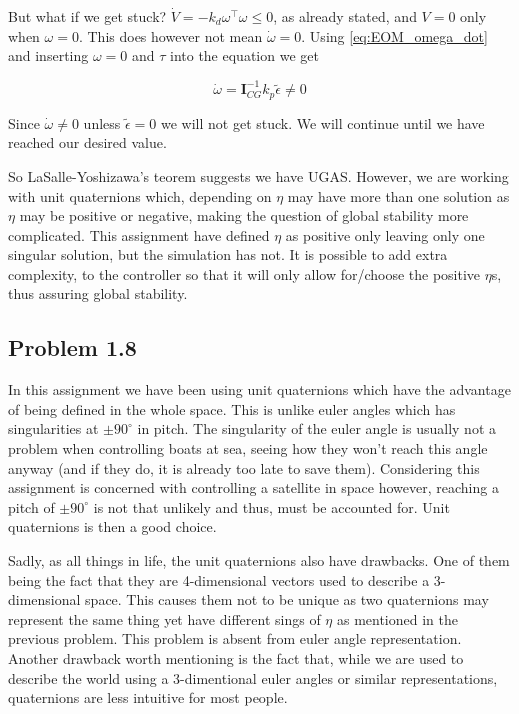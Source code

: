 But what if we get stuck? $\dot{V} = -k_d\omega^\top\omega \leq 0$, as already stated, and $V = 0$ only when $\omega = 0$. This does however not mean $\dot{\omega} = 0$. Using \eqref{eq:EOM_omega_dot} and inserting $\omega = 0$ and $\tau$ into the equation we get

\begin{equation}
    \dot{\omega} = \mathbf{I}_{CG}^{-1}k_p\tilde{\epsilon} \neq 0
\end{equation}

Since $\dot{\omega} \neq 0$ unless $\tilde{\epsilon} = 0$ we will not get stuck. We will continue until we have reached our desired value.

So LaSalle-Yoshizawa's teorem suggests we have UGAS. However, we are working with unit quaternions which, depending on $\eta$ may have more than one solution as $\eta$ may be positive or negative, making the question of global stability more complicated. This assignment have defined $\eta$ as positive only leaving only one singular solution, but the simulation has not. It is possible to add extra complexity, to the controller so that it will only allow for/choose the positive $\eta$s, thus assuring global stability. 


\subsection*{Problem 1.8}

In this assignment we have been using unit quaternions which have the advantage of being defined in the whole space. This is unlike euler angles which has singularities at $\pm 90^\circ$ in pitch. The singularity of the euler angle is usually not a problem when controlling boats at sea, seeing how they won't reach this angle anyway (and if they do, it is already too late to save them). Considering this assignment is concerned with controlling a satellite in space however, reaching a pitch of $\pm 90^\circ$ is not that unlikely and thus, must be accounted for. Unit quaternions is then a good choice.

Sadly, as all things in life, the unit quaternions also have drawbacks. One of them being the fact that they are 4-dimensional vectors used to describe a 3-dimensional space. This causes them not to be unique as two quaternions may represent the same thing yet have different sings of $\eta$ as mentioned in the previous problem. This problem is absent from euler angle representation. Another drawback worth mentioning is the fact that, while we are used to describe the world using a 3-dimentional euler angles or similar representations, quaternions are less intuitive for most people.

 

